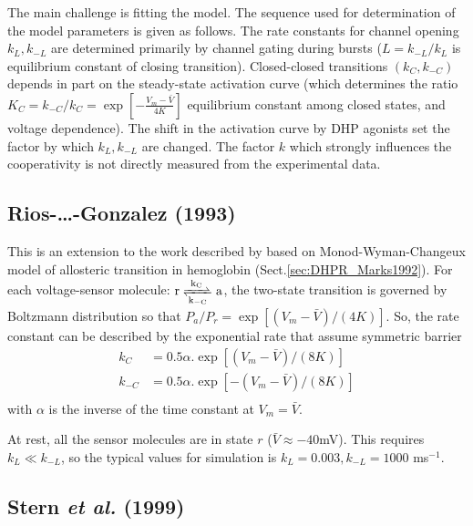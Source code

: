The main challenge is fitting the model. The sequence used for determination of
the model parameters is given as follows. The rate constants for channel opening
$k_L, k_{-L}$ are determined primarily by channel gating during bursts
($L=k_{-L}/k_L$ is equilibrium constant of closing transition).
Closed-closed transitions $(k_C, k_{-C})$ depends in part on the steady-state
activation curve (which determines the ratio
$K_C=k_{-C}/k_C=\exp\left[-\frac{V_m-\bar{V}}{4K}\right]$ equilibrium constant
among closed states, and voltage dependence). The shift in the activation curve
by DHP agonists set the factor by which $k_L, k_{-L}$ are changed. The factor
$k$ which strongly influences the cooperativity is not directly measured from
the experimental data.


\subsection{Rios-\ldots-Gonzalez (1993)}

This is an extension to the work described by \citep{marks1992}
based on Monod-Wyman-Changeux model of allosteric transition in
hemoglobin (Sect.\ref{sec:DHPR_Marks1992}). For each voltage-sensor molecule:
$\ce{r <=>[k_C][k_{-C}] a}$, the two-state transition is governed by Boltzmann
distribution so that $P_a/P_r = \exp[(V_m-\bar{V})/(4K)]$. So, the rate constant
can be described by the exponential rate that assume symmetric barrier
\begin{equation}
\begin{split}
k_C &= 0.5 \alpha . \exp\left[(V_m-\bar{V})/(8K)\right] \\
k_{-C} &= 0.5 \alpha . \exp\left[-(V_m-\bar{V})/(8K)\right] \\
\end{split}
\end{equation}
with $\alpha$ is the inverse of the time constant at $V_m=\bar{V}$.

At rest, all the sensor molecules are in state $r$ ($\bar{V}\approx -40$mV).
This requires $k_L \ll k_{-L}$, so the typical values for simulation is
$k_L=0.003, k_{-L}=1000$ ms$^{-1}$.


\subsection{Stern {\it et al.} (1999)}
\label{sec:RYR_Stern1999}

